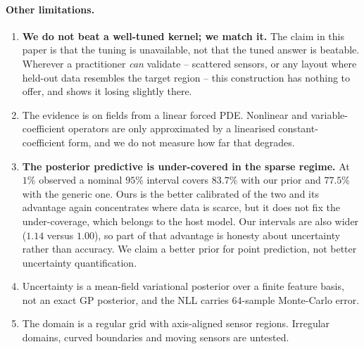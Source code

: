 \paragraph{Other limitations.}
\begin{enumerate}
  \item \textbf{We do not beat a well-tuned kernel; we match it.}  The claim in
        this paper is that the tuning is unavailable, not that the tuned answer
        is beatable.  Wherever a practitioner \emph{can} validate -- scattered
        sensors, or any layout where held-out data resembles the target region --
        this construction has nothing to offer, and  shows it
        losing slightly there.
  \item The evidence is on fields from a linear forced PDE.  Nonlinear and
        variable-coefficient operators are only approximated by a linearised
        constant-coefficient form, and we do not measure how far that degrades.
  \item \textbf{The posterior predictive is under-covered in the sparse regime.}
        At $1\%$ observed a nominal $95\%$ interval covers $83.7\%$ with our
        prior and $77.5\%$ with the generic one.  Ours is the better calibrated
        of the two and its advantage again concentrates where data is scarce, but
        it does not fix the under-coverage, which belongs to the host model.  Our
        intervals are also wider ($1.14$ versus $1.00$), so part of that
        advantage is honesty about uncertainty rather than accuracy.  We claim a
        better prior for point prediction, not better uncertainty quantification.
  \item Uncertainty is a mean-field variational posterior over a finite feature
        basis, not an exact GP posterior, and the NLL carries $64$-sample
        Monte-Carlo error.
  \item The domain is a regular grid with axis-aligned sensor regions.  Irregular
        domains, curved boundaries and moving sensors are untested.
\end{enumerate}
